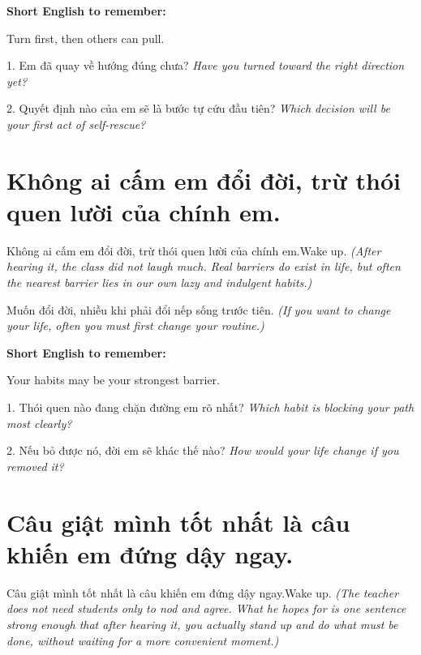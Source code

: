 \begin{ghinhoanh}
\textbf{Short English to remember:}

Turn first, then others can pull.

\end{ghinhoanh}

\begin{tuhocnhanh}
1. Em đã quay về hướng đúng chưa? \textit{Have you turned toward the right direction yet?}

2. Quyết định nào của em sẽ là bước tự cứu đầu tiên? \textit{Which decision will be your first act of self-rescue?}
\end{tuhocnhanh}
\ngancach

\section{Không ai cấm em đổi đời, trừ thói quen lười của chính em.}
\begin{truyen}{Không ai cấm em đổi đời, trừ thói quen lười của chính em.}{Wake up.}
\textit{(After hearing it, the class did not laugh much. Real barriers do exist in life, but often the nearest barrier lies in our own lazy and indulgent habits.)}
\end{truyen}

\begin{baihoc}
Muốn đổi đời, nhiều khi phải đổi nếp sống trước tiên.
\textit{(If you want to change your life, often you must first change your routine.)}
\end{baihoc}

\begin{ghinhoanh}
\textbf{Short English to remember:}

Your habits may be your strongest barrier.

\end{ghinhoanh}

\begin{tuhocnhanh}
1. Thói quen nào đang chặn đường em rõ nhất? \textit{Which habit is blocking your path most clearly?}

2. Nếu bỏ được nó, đời em sẽ khác thế nào? \textit{How would your life change if you removed it?}
\end{tuhocnhanh}
\ngancach

\section{Câu giật mình tốt nhất là câu khiến em đứng dậy ngay.}
\begin{truyen}{Câu giật mình tốt nhất là câu khiến em đứng dậy ngay.}{Wake up.}
\textit{(The teacher does not need students only to nod and agree. What he hopes for is one sentence strong enough that after hearing it, you actually stand up and do what must be done, without waiting for a more convenient moment.)}
\end{truyen}

